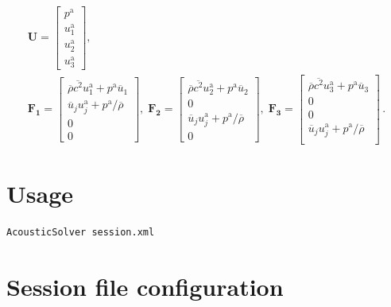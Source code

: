 \begin{gather}
\boldsymbol{U} = \left[
\begin{matrix}
p^\mathrm{a} \\
u^\mathrm{a}_1 \\
u^\mathrm{a}_2 \\
u^\mathrm{a}_3
\end{matrix}
\right] , \\
\boldsymbol{F_1} = \left[
\begin{matrix}
\overline{\rho} \overline{c^2} u^\mathrm{a}_1 + p^\mathrm{a} \overline{u}_1  \\
\overline{u}_j u^\mathrm{a}_j + p^\mathrm{a} / \overline{\rho}  \\
0 \\
0
\end{matrix}
\right]     , \;
\boldsymbol{F_2} = \left[
\begin{matrix}
\overline{\rho} \overline{c^2} u^\mathrm{a}_2 + p^\mathrm{a} \overline{u}_2  \\
0 \\
\overline{u}_j u^\mathrm{a}_j + p^\mathrm{a} / \overline{\rho}  \\
0
\end{matrix}
\right]    , \;
\boldsymbol{F_3} = \left[
\begin{matrix}
\overline{\rho} \overline{c^2} u^\mathrm{a}_3 + p^\mathrm{a} \overline{u}_3 \\
0     \\
0     \\
\overline{u}_j u^\mathrm{a}_j + p^\mathrm{a} / \overline{\rho}  \\
\end{matrix}
\right]
\,.
\end{gather}







\section{Usage}
\begin{lstlisting}[style=BashInputStyle]
AcousticSolver session.xml
\end{lstlisting}

\section{Session file configuration}

